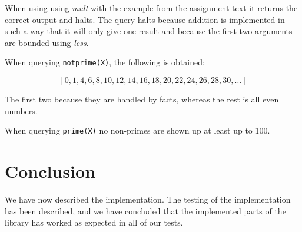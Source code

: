 \documentclass[a4paper, 11pt]{article}
\begin{document}
When using using \emph{mult} with the example from the assignment text it returns the correct output and halts. The query halts because addition is implemented in such a way that it will only give one result and because the first two arguments are bounded using \emph{less}.

When querying \texttt{notprime(X)}, the following is obtained:

\[
    [0, 1, 4, 6, 8, 10, 12, 14, 16, 18, 20, 22, 24, 26, 28, 30, \ldots]
\]

The first two because they are handled by facts, whereas the rest is all even numbers.

When querying \texttt{prime(X)} no non-primes are shown up at least up to 100.


\section{Conclusion} %
\label{sec:conclusion}

We have now described the implementation. The testing of the implementation has been described, and we have concluded that the implemented parts of the library has worked as expected in all of our tests.

\end{document}
